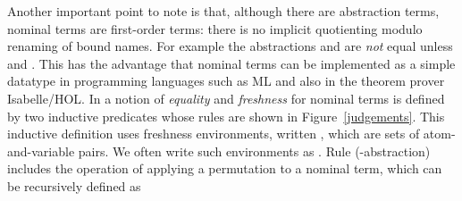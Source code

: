 \begin{isabellebody}
\begin{isamarkuptext}
  Another important point to note is that, although there are abstraction terms,
  nominal terms are first-order terms: there is no implicit 
  quotienting modulo renaming of bound names. For example the abstractions
   and  are \emph{not} equal unless  and .
  This has the advantage that nominal terms can be implemented as a simple
  datatype  in programming languages such as ML and also in the theorem prover Isabelle/HOL.
  In \cite{UrbanPittsGabbay04} a notion of \emph{equality} and \emph{freshness} 
  for nominal terms is defined by two inductive predicates whose rules are shown in 
  Figure~\ref{judgements}. This inductive definition uses freshness environments, written 
  , which are sets of atom-and-variable pairs. We often write such environments as
  . Rule (-abstraction) includes the operation of 
  applying a permutation to a nominal term, which can be recursively defined as


\end{isamarkuptext}
\end{isabellebody}
